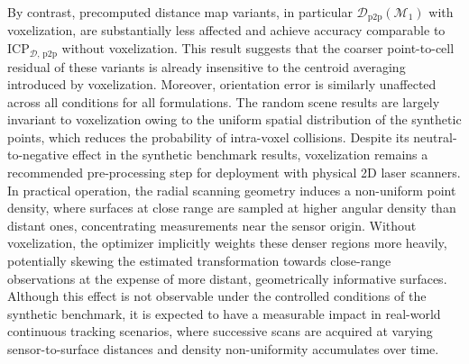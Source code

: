 By contrast, precomputed distance map variants, in particular
$\mathcal{D}_\mathrm{p2p}(\mathcal{M}_1)$ with voxelization, are
substantially less affected and achieve accuracy comparable to
$\mathrm{ICP}_{\mathcal{D},\,\mathrm{p2p}}$ without voxelization.
This result suggests that the coarser point-to-cell residual of these variants
is already insensitive to the centroid averaging introduced by voxelization.
Moreover, orientation error is similarly unaffected across all conditions
for all formulations. The random scene results are largely invariant to
voxelization owing to the uniform spatial distribution of the synthetic points,
which reduces the probability of intra-voxel collisions.
Despite its neutral-to-negative effect in the synthetic benchmark results,
voxelization remains a recommended pre-processing step for deployment with
physical 2D laser scanners. In practical operation, the radial scanning geometry
induces a non-uniform point density, where surfaces at close range are sampled
at higher angular density than distant ones,
concentrating measurements near the sensor origin.
Without voxelization, the optimizer implicitly weights these denser regions
more heavily, potentially skewing the estimated transformation towards
close-range observations at the expense of more distant, geometrically
informative surfaces.
Although this effect is not observable under the controlled conditions of the
synthetic benchmark, it is expected to have a measurable impact in real-world
continuous tracking scenarios, where successive scans are acquired at varying
sensor-to-surface distances and density non-uniformity accumulates over time.

